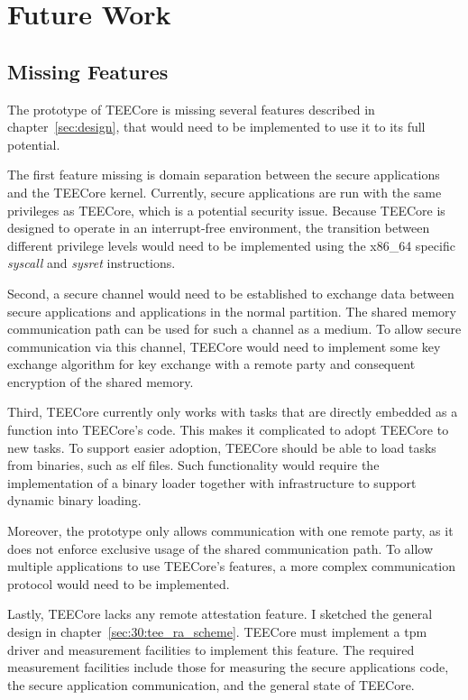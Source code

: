 \chapter{Future Work}
\label{sec:futurework}

\section{Missing Features}
The prototype of TEECore is missing several features described in
chapter~\ref{sec:design}, that would need to be implemented to use it to its
full potential.

The first feature missing is domain separation between the secure applications
and the TEECore kernel. Currently, secure applications are run with the same
privileges as TEECore, which is a potential security issue. Because TEECore is
designed to operate in an interrupt-free environment, the transition between
different privilege levels would need to be implemented using the x86\_64
specific \textit{syscall} and \textit{sysret} instructions.

Second, a secure channel would need to be established to exchange data between
secure applications and applications in the normal partition. The shared memory
communication path can be used for such a channel as a medium. To allow secure
communication via this channel, TEECore would need to implement some key
exchange algorithm for key exchange with a remote party and consequent
encryption of the shared memory.

Third, TEECore currently only works with tasks that are directly embedded as a
function into TEECore's code. This makes it complicated to adopt TEECore to new
tasks. To support easier adoption, TEECore should be able to load tasks from
binaries, such as \gls{elf} files. Such functionality would require the
implementation of a binary loader together with infrastructure to support
dynamic binary loading.

Moreover, the prototype only allows communication with one remote party, as it
does not enforce exclusive usage of the shared communication path. To allow
multiple applications to use TEECore's features, a more complex communication
protocol would need to be implemented.

Lastly, TEECore lacks any remote attestation feature. I sketched the general
design in chapter~\ref{sec:30:tee_ra_scheme}. TEECore must implement a \gls{tpm}
driver and measurement facilities to implement this feature. The required
measurement facilities include those for measuring the secure applications code,
the secure application communication, and the general state of TEECore.

